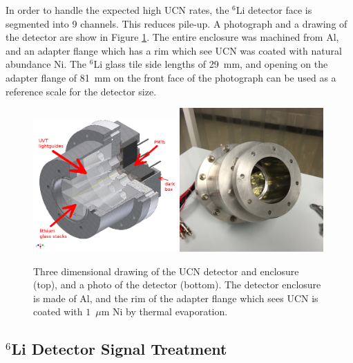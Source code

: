 \documentclass[letter,twocolumn,preprint,3p,numbers,sort&compress]{elsarticle}
\begin{document}
In order to handle the expected high UCN rates, the $^6$Li detector
face is segmented into 9 channels.  This reduces pile-up.  A
photograph and a drawing of the detector are show in Figure
\ref{fig:detdesigned}.  The entire enclosure was machined from Al, and
an adapter flange which has a rim which see UCN was coated with
natural abundance Ni.  The ${^6}$Li glass tile side lengths of 29~mm,
and opening on the adapter flange of 81~mm on the front face of the
photograph can be used as a reference scale for the detector size.

\begin{figure}[!htpb] 
\includegraphics[width=0.49\textwidth]{figures/detdesigned.png} 
\includegraphics[width=0.49\textwidth]{figures/ucndet.png} 
\caption{\label{fig:detdesigned} Three dimensional drawing of the UCN
  detector and enclosure (top), and a photo of the detector (bottom).
  The detector enclosure is made of Al, and the rim of the adapter
  flange which sees UCN is coated with $1$~$\mu$m Ni by thermal
  evaporation.}
\end{figure} 

\subsection{$^6$Li Detector Signal Treatment}
\end{document}

